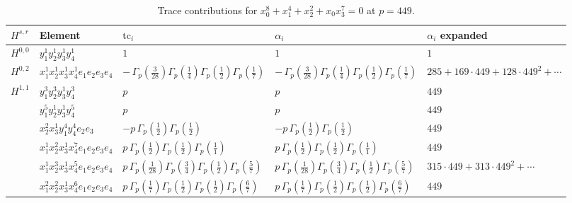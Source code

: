 \documentclass[11pt]{article}
\begin{document}
\begin{table}[ht]
\centering
\caption{Trace contributions for $x_0^{8} + x_1^{4} + x_2^{2} + x_0 x_3^{7} = 0$ at $p=449$.}\label{tab:deformed-8}
\renewcommand{\arraystretch}{1.1}
{\scriptsize
\begin{tabular}{@{}lllll@{}}
\toprule
$H^{s,r}$ & Element & $\mathrm{tc}_i$ & $\alpha_i$ & $\alpha_i$ expanded \\
\midrule
$H^{0,0}$ & $y_{1}^{1} y_{2}^{1} y_{3}^{1} y_{4}^{1}$ & $1$ & $1$ & $1$ \\
\midrule
$H^{0,2}$ & $x_{1}^{1} x_{2}^{1} x_{3}^{1} x_{4}^{1}  e_{1} e_{2} e_{3} e_{4}$ & $- \, \Gamma_p \left( \frac{3}{28} \right) \Gamma_p \left( \frac{1}{4} \right) \Gamma_p \left( \frac{1}{2} \right) \Gamma_p \left( \frac{1}{7} \right)$ & $- \, \Gamma_p \left( \frac{3}{28} \right) \Gamma_p \left( \frac{1}{4} \right) \Gamma_p \left( \frac{1}{2} \right) \Gamma_p \left( \frac{1}{7} \right)$ & $285{+}169{\cdot}449{+}128{\cdot}449^{2}{+}\cdots$ \\
\midrule
$H^{1,1}$ & $y_{1}^{3} y_{2}^{3} y_{3}^{1} y_{4}^{3}$ & $p \,$ & $p \,$ & $449$ \\
 & $y_{1}^{5} y_{2}^{1} y_{3}^{1} y_{4}^{5}$ & $p \,$ & $p \,$ & $449$ \\
 & $x_{2}^{2} x_{3}^{1} y_{1}^{4} y_{4}^{4} e_{2} e_{3}$ & $- p \, \Gamma_p \left( \frac{1}{2} \right) \Gamma_p \left( \frac{1}{2} \right)$ & $- p \, \Gamma_p \left( \frac{1}{2} \right) \Gamma_p \left( \frac{1}{2} \right)$ & $449$ \\
 & $x_{1}^{1} x_{2}^{2} x_{3}^{1} x_{4}^{7}  e_{1} e_{2} e_{3} e_{4}$ & $p \, \Gamma_p \left( \frac{1}{2} \right) \Gamma_p \left( \frac{1}{2} \right) \Gamma_p \left( \frac{1}{1} \right)$ & $p \, \Gamma_p \left( \frac{1}{2} \right) \Gamma_p \left( \frac{1}{2} \right) \Gamma_p \left( \frac{1}{1} \right)$ & $449$ \\
 & $x_{1}^{1} x_{2}^{3} x_{3}^{1} x_{4}^{5}  e_{1} e_{2} e_{3} e_{4}$ & $p \, \Gamma_p \left( \frac{1}{28} \right) \Gamma_p \left( \frac{3}{4} \right) \Gamma_p \left( \frac{1}{2} \right) \Gamma_p \left( \frac{5}{7} \right)$ & $p \, \Gamma_p \left( \frac{1}{28} \right) \Gamma_p \left( \frac{3}{4} \right) \Gamma_p \left( \frac{1}{2} \right) \Gamma_p \left( \frac{5}{7} \right)$ & $315{\cdot}449{+}313{\cdot}449^{2}{+}\cdots$ \\
 & $x_{1}^{2} x_{2}^{2} x_{3}^{1} x_{4}^{6}  e_{1} e_{2} e_{3} e_{4}$ & $p \, \Gamma_p \left( \frac{1}{7} \right) \Gamma_p \left( \frac{1}{2} \right) \Gamma_p \left( \frac{1}{2} \right) \Gamma_p \left( \frac{6}{7} \right)$ & $p \, \Gamma_p \left( \frac{1}{7} \right) \Gamma_p \left( \frac{1}{2} \right) \Gamma_p \left( \frac{1}{2} \right) \Gamma_p \left( \frac{6}{7} \right)$ & $449$ \\

\end{tabular}}
\end{table}
\end{document}
